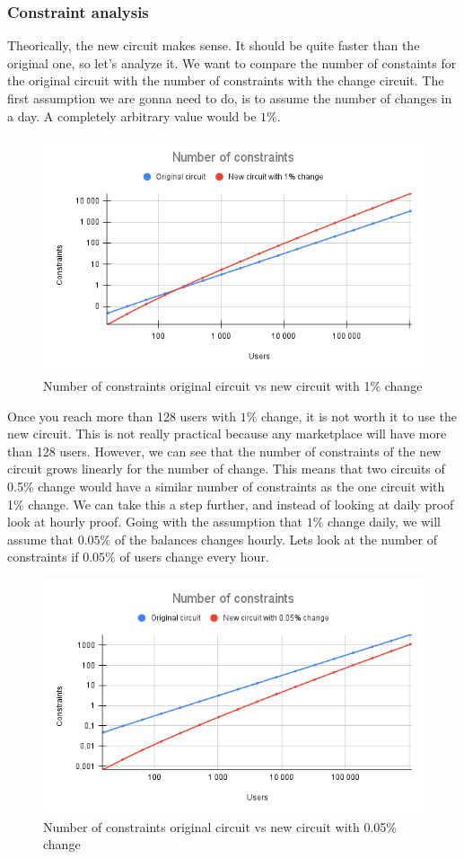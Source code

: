 \subsubsection{Constraint analysis}
Theorically, the new circuit makes sense. It should be quite faster than the original one, so let's analyze it.
We want to compare the number of constaints for the original circuit with the number of constraints with the change circuit.
The first assumption we are gonna need to do, is to assume the number of changes in a day. A completely arbitrary value would be $1\%$.
\begin{figure}[H]
   \centering
   \includegraphics[width=130mm]{Number of constraints.png}
   \caption{Number of constraints original circuit vs new circuit with 1\% change}
   \label{overflow}
   \end{figure}
Once you reach more than 128 users with $1\%$ change, it is not worth it to use the new circuit. 
This is not really practical because any marketplace will have more than 128 users.
However, we can see that the number of constraints of the new circuit grows linearly for the number of change.
This means that two circuits of 0.5\% change would have a similar number of constraints as the one circuit with 1\% change.
We can take this a step further, and instead of looking at daily proof look at hourly proof.
Going with the assumption that $1\%$ change daily, we will assume that $0.05\%$ of the balances changes hourly.
Lets look at the number of constraints if $0.05\%$ of users change every hour.
\begin{figure}[H]
   \centering
   \includegraphics[width=130mm]{Number of constraints .05.png}
   \caption{Number of constraints original circuit vs new circuit with 0.05\% change}
   \label{overflow}
   \end{figure}
